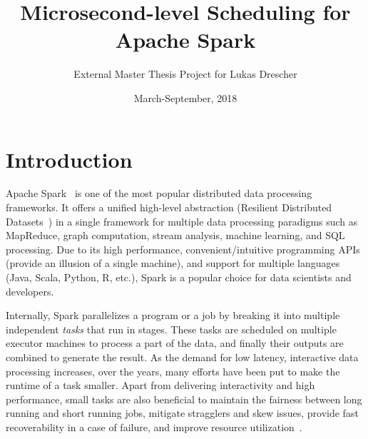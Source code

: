 \documentclass[10pt,a4paper]{article}
\begin{document}
\title{Microsecond-level Scheduling for Apache Spark}

\author{External Master Thesis Project for Lukas Drescher}
\date{March-September, 2018}

\maketitle



\section*{Introduction}
Apache Spark~\cite{2018-apache-spark} is one of the most popular distributed
data processing frameworks. It offers a unified high-level abstraction 
(Resilient Distributed Datasets~\cite{2011-nsdi-rdd}) in a single framework 
for multiple data processing paradigms such as MapReduce, graph computation,
stream analysis, machine learning, and SQL processing. Due to its high
performance, convenient/intuitive programming APIs (provide an illusion 
of a single machine), and support for multiple languages (Java, Scala, Python, 
R, etc.), Spark is a popular choice for data scientists and developers. 


Internally, Spark parallelizes a program or a job by breaking it into multiple 
independent \textit{tasks} that run in stages. These tasks are scheduled on
multiple executor machines to process a part of the data, and finally their
outputs are combined to generate the result. As the demand for low latency, 
interactive data processing increases, over the years, many efforts have been 
put to make the runtime of a task smaller. Apart from delivering interactivity 
and high performance, small tasks are also beneficial to maintain the fairness 
between long running and short running jobs, mitigate stragglers and 
skew issues, provide fast recoverability in a case of failure, and improve 
resource utilization~\cite{2013-hotos-tiny-tasks}. 
\end{document}
